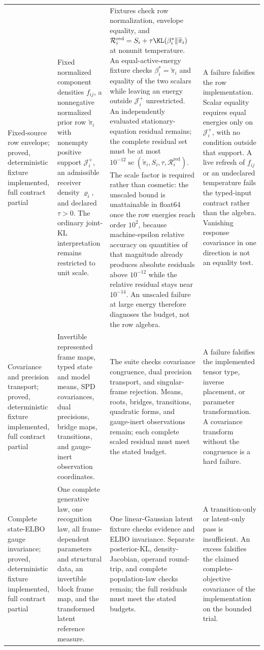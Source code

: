 \begin{longtable}{>{\raggedright\arraybackslash}p{}>{\raggedright\arraybackslash}p{}>{\raggedright\arraybackslash}p{}>{\raggedright\arraybackslash}p{}}
Fixed-source row envelope; proved, deterministic fixture implemented, full contract partial & Fixed normalized component densities \(f_{ij}\), a nonnegative normalized prior row \(\widetilde\pi_i\) with nonempty positive support \(\mathcal J_i^+\), an admissible receiver density \(\varrho_i\), and declared \(\tau>0\). The ordinary joint-KL interpretation remains restricted to unit scale. & Fixtures check row normalization, envelope equality, and \(\mathcal R_i^{\mathrm{red}}=S_i+\tau\KL(\beta_i^*\Vert\widetilde\pi_i)\) at nonunit temperature. An equal-active-energy fixture checks \(\beta_i^*=\widetilde\pi_i\) and equality of the two scalars while leaving an energy outside \(\mathcal J_i^+\) unrestricted. An independently evaluated stationary-equation residual remains; the complete residual set must be at most \(10^{-12}\operatorname{sc}(\widetilde\pi_i,S_i,\tau,\mathcal R_i^{\mathrm{red}})\). The scale factor is required rather than cosmetic: the unscaled bound is unattainable in float64 once the row energies reach order \(10^{2}\), because machine-epsilon relative accuracy on quantities of that magnitude already produces absolute residuals above \(10^{-12}\) while the relative residual stays near \(10^{-14}\). An unscaled failure at large energy therefore diagnoses the budget, not the row algebra. & A failure falsifies the row implementation. Scalar equality requires equal energies only on \(\mathcal J_i^+\), with no condition outside that support. A live refresh of \(f_{ij}\) or an undeclared temperature fails the typed-input contract rather than the algebra. Vanishing response covariance in one direction is not an equality test. \\
\addlinespace
Covariance and precision transport; proved, deterministic fixture implemented, full contract partial & Invertible represented frame maps, typed state and model means, SPD covariances, dual precisions, bridge maps, transitions, and gauge-inert observation coordinates. & The suite checks covariance congruence, dual precision transport, and singular-frame rejection. Means, roots, bridges, transitions, quadratic forms, and gauge-inert observations remain; each complete scaled residual must meet the stated budget. & A failure falsifies the implemented tensor type, inverse placement, or parameter transformation. A covariance transform without the congruence is a hard failure. \\
\addlinespace
Complete state-ELBO gauge invariance; proved, deterministic fixture implemented, full contract partial & One complete generative law, one recognition law, all frame-dependent parameters and structural data, an invertible block frame map, and the transformed latent reference measure. & One linear-Gaussian latent fixture checks evidence and ELBO invariance. Separate posterior-KL, density-Jacobian, operand round-trip, and complete population-law checks remain; the full residuals must meet the stated budgets. & A transition-only or latent-only pass is insufficient. An excess falsifies the claimed complete-objective covariance of the implementation on the bounded trial. \\

\end{longtable}
